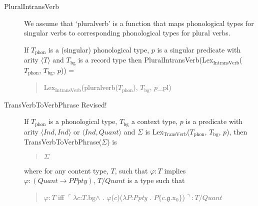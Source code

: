 \begin{description}
  
\item[\textnormal{PluralIntransVerb}] \mbox{}

  We assume that `pluralverb' is a function that maps phonological
  types for singular verbs to corresponding phonological types
  for plural verbs.

  If $T_{\text{phon}}$ is a (singular) phonological type, $p$ is a
  singular predicate with arity $\langle T\rangle$ and $T_{\text{bg}}$
  is a record type then
  PluralIntransVerb(Lex$_{\text{IntransVerb}}$($T_{\text{phon}}$,
  $T_{\text{bg}}$, $p$)) =
  \begin{quote}
    Lex$_{\text{IntransVerb}}$(pluralverb($T_{\text{phon}}$),
    $T_{\text{bg}}$, $p$\_pl)
  \end{quote} 
        
\item[\textnormal{TransVerbToVerbPhrase} Revised!] \mbox{}

  If $T_{\text{phon}}$ is a phonological type, $T_{\text{bg}}$ a
  context type, $p$ is a predicate with arity
  $\langle\textit{Ind},\textit{Ind}\rangle$ or
  $\langle\textit{Ind},\textit{Quant}\rangle$ and $\Sigma$ is
  Lex$_{\text{TransVerb}}$($T_{\text{phon}}$, $T_{\text{bg}}$, $p$),
  then TransVerbToVerbPhrase($\Sigma$) is
  \begin{quote}
    $\Sigma$ \fbox{\d{$\wedge$}} 
  \end{quote}
  where for any content type, $T$, such that $\varphi:T$ implies
  $\varphi:(\textit{Quant}\rightarrow\textit{PPpty})$, $T/\textit{Quant}$
  is a type such that 
  \begin{quote}
    $\varphi:T$ iff
    $\ulcorner\lambda c$:$T$.bg\d{$\wedge$}
    . $\varphi$($c$)($\lambda P$:\textit{Ppty}
    . $P\{c.\mathfrak{g}.\text{x}_0\}$)$\urcorner:T/\textit{Quant}$
  \end{quote}
  
  
  
\end{description}



